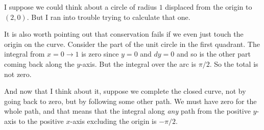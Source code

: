 \documentclass[11pt, oneside]{article}   	%
\begin{document}
I suppose we could think about a circle of radius $1$ displaced from the origin to $(2,0)$.  But I ran into trouble trying to calculate that one.

It is also worth pointing out that conservation fails if we even just touch the origin on the curve.  Consider the part of the unit circle in the first quadrant.  The integral from $x=0 \rightarrow 1$ is zero since $y=0$ and $dy=0$ and so is the other part coming back along the $y$-axis.  But the integral over the arc is $\pi/2$.  So the total is not zero.

And now that I think about it, suppose we complete the closed curve, not by going back to zero, but by following some other path.  We must have zero for the whole path, and that means that the integral along \emph{any} path from the positive $y$-axis to the positive $x$-axis excluding the origin is $- \pi/2$.
\end{document}

